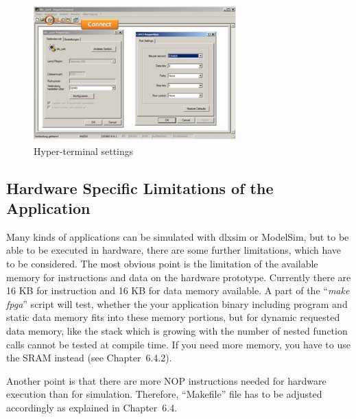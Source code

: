 \begin{figure}[!htb]
	\centering
	\includegraphics[width=0.7\textwidth]{src/images/6-6.png}
	\caption{Hyper-terminal settings}
	\label{fig:fig66}
\end{figure}
\hypertarget{hardware-specific-limitations-of-the-application}{%
\subsection{Hardware Specific Limitations of the
Application}\label{hardware-specific-limitations-of-the-application}}

Many kinds of applications can be simulated with dlxsim or ModelSim, but
to be able to be executed in hardware, there are some further
limitations, which have to be considered. The most obvious point is the
limitation of the available memory for instructions and data on the
hardware prototype. Currently there are 16 KB for instruction and 16 KB
for data memory available. A part of the ``\emph{make fpga}'' script
will test, whether the your application binary including program and
static data memory fits into these memory portions, but for dynamic
requested data memory, like the stack which is growing with the number
of nested function calls cannot be tested at compile time. If you need
more memory, you have to use the SRAM instead (see Chapter~6.4.2).

Another point is that there are more NOP instructions needed for
hardware execution than for simulation. Therefore, ``Makefile'' file has
to be adjusted accordingly as explained in Chapter~6.4.


